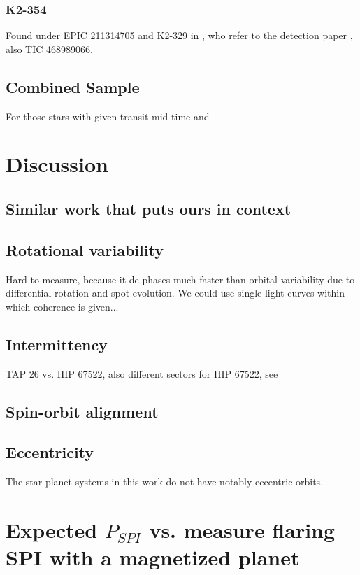 \documentclass[twocolumn]{aastex631}
\begin{document}
\subsubsection{K2-354}
Found under EPIC 211314705 and K2-329 in \cite{bouma2020cluster}, who refer to the detection paper \cite{pope2016transiting}, also TIC 468989066.






\subsection{Combined Sample}

For those stars with given transit mid-time and 
\section{Discussion}
\label{sec:discussion}

\subsection{Similar work that puts ours in context}

\subsection{Rotational variability}
Hard to measure, because it de-phases much faster than orbital variability due to differential rotation and spot evolution. We could use single light curves within which coherence is given...

\subsection{Intermittency}

TAP 26 vs. HIP 67522, also different sectors for HIP 67522, see \cite{shkolnik2008nature}

\subsection{Spin-orbit alignment}

\subsection{Eccentricity}
The star-planet systems in this work do not have notably eccentric orbits.


\appendix
\section{Expected $P_{SPI}$ vs. measure flaring SPI with a magnetized planet}
\end{document}
